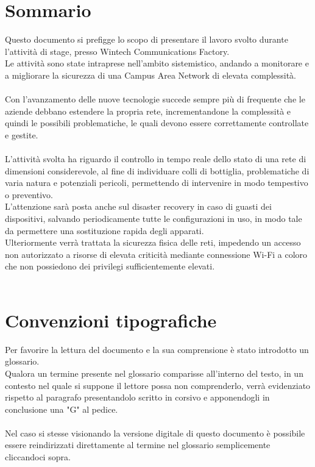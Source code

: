 \documentclass[Tesi.tex]{subfiles}
\begin{document}
\clearpage\thispagestyle{empty}
	
\renewcommand{\chaptername}{}
\renewcommand{\thechapter}{}
\chapter{Sommario}
Questo documento si prefigge lo scopo di presentare il lavoro svolto durante l'attività di stage, presso Wintech Communications Factory. \\
Le attività sono state intraprese nell'ambito sistemistico, andando a monitorare e a migliorare la sicurezza di una Campus Area Network di elevata complessità. \\\\

Con l'avanzamento delle nuove tecnologie succede sempre più di frequente che le aziende debbano estendere la propria rete, incrementandone la complessità e quindi le possibili problematiche, le quali devono essere correttamente controllate e gestite. \\\\
L'attività svolta ha riguardo il controllo in tempo reale dello stato di una rete di dimensioni considerevole, al fine di individuare colli di bottiglia, problematiche di varia natura e potenziali pericoli, permettendo di intervenire in modo tempestivo o preventivo.\\
L'attenzione sarà posta anche sul disaster recovery in caso di guasti dei dispositivi, salvando periodicamente tutte le configurazioni in uso, in modo tale da permettere una sostituzione rapida degli apparati. \\
Ulteriormente verrà trattata la sicurezza fisica delle reti, impedendo un accesso non autorizzato a risorse di elevata criticità mediante connessione Wi-Fi a coloro che non possiedono dei privilegi sufficientemente elevati. \\\\


\newpage
\chapter{Convenzioni tipografiche}
Per favorire la lettura del documento e la sua comprensione è stato introdotto un glossario. \\
Qualora un termine presente nel glossario comparisse all'interno del testo, in un contesto nel quale si suppone il lettore possa non comprenderlo, verrà evidenziato rispetto al paragrafo presentandolo scritto in corsivo e apponendogli in conclusione una "G" al pedice. \\\\
Nel caso si stesse visionando la versione digitale di questo documento è possibile essere reindirizzati direttamente al termine nel glossario semplicemente cliccandoci sopra. \\


\clearpage
\end{document}
